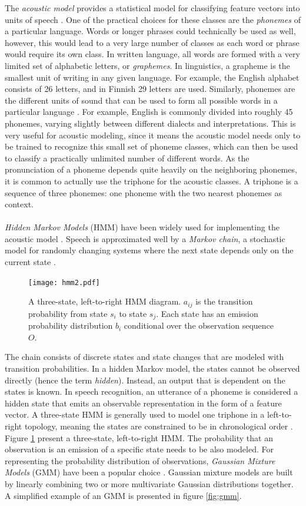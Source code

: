 \documentclass[english, 12pt, a4paper, pdftex, elec, utf8]{aaltothesis}
\begin{document}
The \textit{acoustic model} provides a statistical model for classifying feature vectors into units of speech \cite{kallasjoki2016}. One of the practical choices for these classes are the \textit{phonemes} of a particular language. Words or longer phrases could technically be used as well, however, this would lead to a very large number of classes as each word or phrase would require its own class. In written language, all words are formed with a very limited set of alphabetic letters, or \textit{graphemes}. In linguistics, a grapheme is the smallest unit of writing in any given language. For example, the English alphabet consists of 26 letters, and in Finnish 29 letters are used. Similarly, phonemes are the different units of sound that can be used to form all possible words in a particular language \cite[p.~24--25]{huang2001spoken}. For example, English is commonly divided into roughly 45 phonemes, varying slightly between different dialects and interpretations. This is very useful for acoustic modeling, since it means the acoustic model needs only to be trained to recognize this small set of phoneme classes, which can then be used to classify a practically unlimited number of different words. As the pronunciation of a phoneme depends quite heavily on the neighboring phonemes, it is common to actually use the triphone for the acoustic classes. A triphone is a sequence of three phonemes: one phoneme with the two nearest phonemes as context. \\\\
\textit{Hidden Markov Models} (HMM) have been widely used for implementing the acoustic model \cite{gales2008application, hori2013speech}. Speech is approximated well by a \textit{Markov chain}, a stochastic model for randomly changing systems where the next state depends only on the current state \cite[p.~23--26]{yu2014automatic}. 
\begin{figure}[b]
	\centering
	\texttt{[image: hmm2.pdf]}
	\caption{A three-state, left-to-right HMM diagram. $a_{ij}$ is the transition probability from state $s_i$ to state $s_j$. Each state has an emission probability distribution $b_i$ conditional over the observation sequence $O$.}
	\label{fig:hmm} 
\end{figure}
The chain consists of discrete states and state changes that are modeled with transition probabilities. In a hidden Markov model, the states cannot be observed directly (hence the term \textit{hidden}). Instead, an output that is dependent on the states is known. In speech recognition, an utterance of a phoneme is considered a hidden state that emits an observable representation in the form of a feature vector. A three-state HMM is generally used to model one triphone in a left-to-right topology, meaning the states are constrained to be in chronological order \cite{kallasjoki2016}. Figure \ref{fig:hmm} present a three-state, left-to-right HMM. The probability that an observation is an emission of a specific state needs to be also modeled. For representing the probability distribution of observations, \textit{Gaussian Mixture Models} (GMM) have been a popular choice \cite{gales2008application, hinton2012deep}. Gaussian mixture models are built by linearly combining two or more multivariate Gaussian distributions together. A simplified example of an GMM is presented in figure \ref{fig:gmm}.
\end{document}
